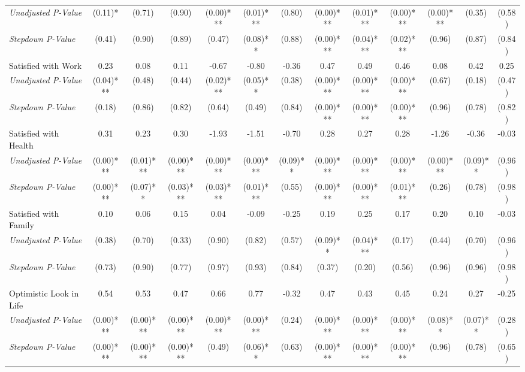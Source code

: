 \begin{tabular}{l c c c c c c c c c c c c}
\quad \textit{Unadjusted P-Value} & (0.11)* & (0.71) & (0.90) & (0.00)*** & (0.01)*** & (0.80) & (0.00)*** & (0.01)*** & (0.00)*** & (0.00)*** & (0.35) & (0.58) \\
\quad \textit{Stepdown P-Value} & (0.41) & (0.90) & (0.89) & (0.47) & (0.08)** & (0.88) & (0.00)*** & (0.04)*** & (0.02)*** & (0.96) & (0.87) & (0.84) \\
Satisfied with Work & 0.23 & 0.08 & 0.11 & -0.67 & -0.80 & -0.36 & 0.47 & 0.49 & 0.46 & 0.08 & 0.42 & 0.25 \\
\quad \textit{Unadjusted P-Value} & (0.04)*** & (0.48) & (0.44) & (0.02)*** & (0.05)** & (0.38) & (0.00)*** & (0.00)*** & (0.00)*** & (0.67) & (0.18) & (0.47) \\
\quad \textit{Stepdown P-Value} & (0.18) & (0.86) & (0.82) & (0.64) & (0.49) & (0.84) & (0.00)*** & (0.00)*** & (0.00)*** & (0.96) & (0.78) & (0.82) \\
Satisfied with Health & 0.31 & 0.23 & 0.30 & -1.93 & -1.51 & -0.70 & 0.28 & 0.27 & 0.28 & -1.26 & -0.36 & -0.03 \\
\quad \textit{Unadjusted P-Value} & (0.00)*** & (0.01)*** & (0.00)*** & (0.00)*** & (0.00)*** & (0.09)** & (0.00)*** & (0.00)*** & (0.00)*** & (0.00)*** & (0.09)** & (0.96) \\
\quad \textit{Stepdown P-Value} & (0.00)*** & (0.07)** & (0.03)*** & (0.03)*** & (0.01)*** & (0.55) & (0.00)*** & (0.00)*** & (0.01)*** & (0.26) & (0.78) & (0.98) \\
Satisfied with Family & 0.10 & 0.06 & 0.15 & 0.04 & -0.09 & -0.25 & 0.19 & 0.25 & 0.17 & 0.20 & 0.10 & -0.03 \\
\quad \textit{Unadjusted P-Value} & (0.38) & (0.70) & (0.33) & (0.90) & (0.82) & (0.57) & (0.09)** & (0.04)*** & (0.17) & (0.44) & (0.70) & (0.96) \\
\quad \textit{Stepdown P-Value} & (0.73) & (0.90) & (0.77) & (0.97) & (0.93) & (0.84) & (0.37) & (0.20) & (0.56) & (0.96) & (0.96) & (0.98) \\
Optimistic Look in Life & 0.54 & 0.53 & 0.47 & 0.66 & 0.77 & -0.32 & 0.47 & 0.43 & 0.45 & 0.24 & 0.27 & -0.25 \\
\quad \textit{Unadjusted P-Value} & (0.00)*** & (0.00)*** & (0.00)*** & (0.00)*** & (0.00)*** & (0.24) & (0.00)*** & (0.00)*** & (0.00)*** & (0.08)** & (0.07)** & (0.28) \\
\quad \textit{Stepdown P-Value} & (0.00)*** & (0.00)*** & (0.00)*** & (0.49) & (0.06)** & (0.63) & (0.00)*** & (0.00)*** & (0.00)*** & (0.96) & (0.78) & (0.65) \\

\end{tabular}
